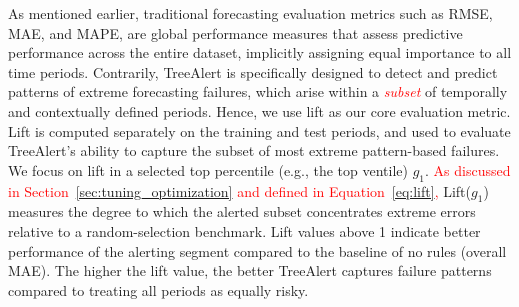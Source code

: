 \documentclass[]{interact}
\newcommand{\matt}[1]{\textcolor{red}{#1}}
\theoremstyle{definition}
\begin{document}
As mentioned earlier, traditional forecasting evaluation metrics such as RMSE, MAE, and MAPE, are global performance measures that assess predictive performance across the entire dataset, implicitly assigning equal importance to all time periods. Contrarily, TreeAlert is specifically designed to detect and predict patterns of extreme forecasting failures, which arise within a \matt{\emph{subset}} of temporally and contextually defined periods. Hence, we use lift as our core evaluation metric. Lift is computed separately on the training and test periods, and used to evaluate TreeAlert's ability to capture the subset of most extreme pattern-based failures. We focus on lift in a selected top percentile (e.g., the top ventile) $g_1$. \matt{As discussed in Section~\ref{sec:tuning_optimization} and defined in Equation~\eqref{eq:lift},} Lift($g_1$) measures the degree to which the alerted subset concentrates extreme errors relative to a random-selection benchmark. Lift values above 1 indicate better performance of the alerting segment compared to the baseline of no rules (overall MAE). The higher the lift value, the better TreeAlert captures failure patterns compared to treating all periods as equally risky. %


\end{document}
